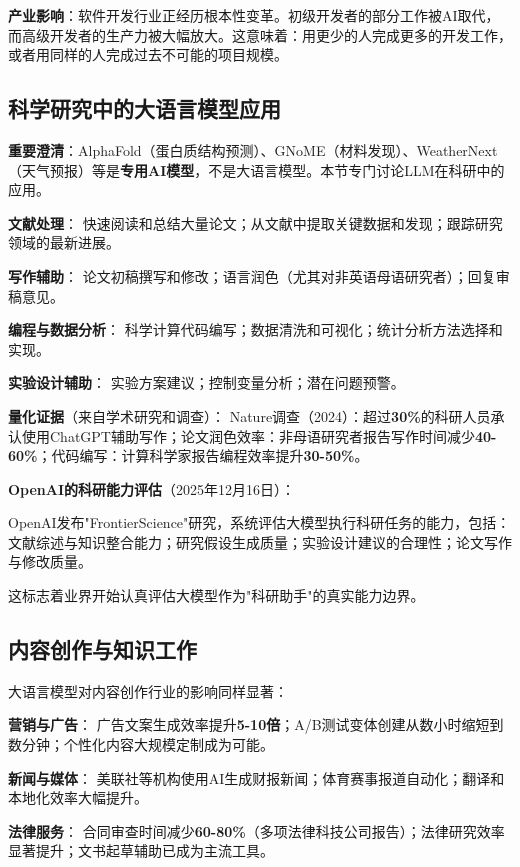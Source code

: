 \textbf{产业影响}：软件开发行业正经历根本性变革。初级开发者的部分工作被AI取代，而高级开发者的生产力被大幅放大。这意味着：用更少的人完成更多的开发工作，或者用同样的人完成过去不可能的项目规模。

\subsection{科学研究中的大语言模型应用}

\textbf{重要澄清}：AlphaFold（蛋白质结构预测）、GNoME（材料发现）、WeatherNext（天气预报）等是\textbf{专用AI模型}，不是大语言模型。本节专门讨论LLM在科研中的应用。

\textbf{文献处理}：
快速阅读和总结大量论文；从文献中提取关键数据和发现；跟踪研究领域的最新进展。

\textbf{写作辅助}：
论文初稿撰写和修改；语言润色（尤其对非英语母语研究者）；回复审稿意见。

\textbf{编程与数据分析}：
科学计算代码编写；数据清洗和可视化；统计分析方法选择和实现。

\textbf{实验设计辅助}：
实验方案建议；控制变量分析；潜在问题预警。

\textbf{量化证据}（来自学术研究和调查）：
Nature调查（2024）：超过\textbf{30\%}的科研人员承认使用ChatGPT辅助写作；论文润色效率：非母语研究者报告写作时间减少\textbf{40-60\%}；代码编写：计算科学家报告编程效率提升\textbf{30-50\%}。

\textbf{OpenAI的科研能力评估}（2025年12月16日）：

OpenAI发布"FrontierScience"研究，系统评估大模型执行科研任务的能力，包括：
文献综述与知识整合能力；研究假设生成质量；实验设计建议的合理性；论文写作与修改质量。

这标志着业界开始认真评估大模型作为"科研助手"的真实能力边界。

\subsection{内容创作与知识工作}

大语言模型对内容创作行业的影响同样显著：

\textbf{营销与广告}：
广告文案生成效率提升\textbf{5-10倍}；A/B测试变体创建从数小时缩短到数分钟；个性化内容大规模定制成为可能。

\textbf{新闻与媒体}：
美联社等机构使用AI生成财报新闻；体育赛事报道自动化；翻译和本地化效率大幅提升。

\textbf{法律服务}：
合同审查时间减少\textbf{60-80\%}（多项法律科技公司报告）；法律研究效率显著提升；文书起草辅助已成为主流工具。

